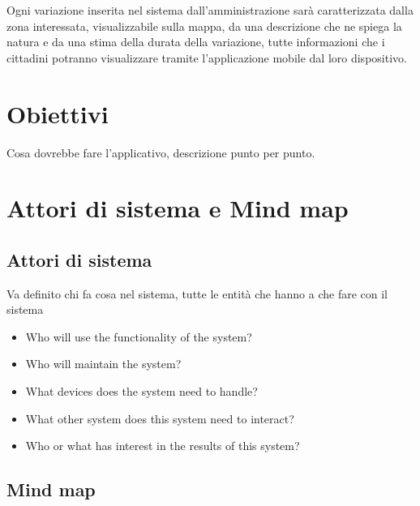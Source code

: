 \documentclass{article}
\begin{document}
Ogni variazione inserita nel sistema dall'amministrazione sarà caratterizzata dalla zona interessata, visualizzabile sulla mappa, da una descrizione che ne spiega la natura e da una stima della durata della variazione, tutte informazioni che i cittadini potranno visualizzare tramite l'applicazione mobile dal loro dispositivo.
\clearpage

\clearpage

\section{Obiettivi}

Cosa dovrebbe fare l'applicativo, descrizione punto per punto.\\

\clearpage

\section{Attori di sistema e Mind map}

\subsection{Attori di sistema}

Va definito chi fa cosa nel sistema, tutte le entità che hanno a che fare con il sistema
\begin{itemize}
    \item Who will use the functionality of the system?
    \item Who will maintain the system?
    \item What devices does the system need to handle?
    \item What other system does this system need to interact?
    \item Who or what has interest in the results of this system?
\end{itemize}

\clearpage

\subsection{Mind map}

\end{document}
